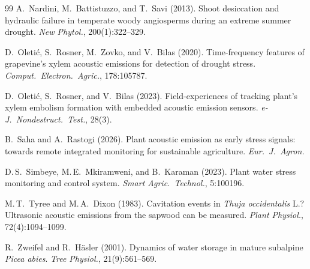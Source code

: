 \documentclass[10pt,a4paper,twocolumn]{article}
\begin{document}
{\begin{thebibliography}{99}
A.~Nardini, M.~Battistuzzo, and T.~Savi (2013).
Shoot desiccation and hydraulic failure in temperate woody angiosperms during an extreme summer drought.
\textit{New Phytol.}, 200(1):322--329.

D.~Oleti\'{c}, S.~Rosner, M.~Zovko, and V.~Bilas (2020).
Time-frequency features of grapevine's xylem acoustic emissions for detection of drought stress.
\textit{Comput.\ Electron.\ Agric.}, 178:105787.

D.~Oleti\'{c}, S.~Rosner, and V.~Bilas (2023).
Field-experiences of tracking plant's xylem embolism formation with embedded acoustic emission sensors.
\textit{e-J.\ Nondestruct.\ Test.}, 28(3).

B.~Saha and A.~Rastogi (2026).
Plant acoustic emission as early stress signals: towards remote integrated monitoring for sustainable agriculture.
\textit{Eur.\ J.\ Agron.}

D.\,S.~Simbeye, M.\,E.~Mkiramweni, and B.~Karaman (2023).
Plant water stress monitoring and control system.
\textit{Smart Agric.\ Technol.}, 5:100196.

M.\,T.~Tyree and M.\,A.~Dixon (1983).
Cavitation events in \textit{Thuja occidentalis} L.?
Ultrasonic acoustic emissions from the sapwood can be measured.
\textit{Plant Physiol.}, 72(4):1094--1099.

R.~Zweifel and R.~H\"asler (2001).
Dynamics of water storage in mature subalpine \textit{Picea abies}.
\textit{Tree Physiol.}, 21(9):561--569.

\end{thebibliography}
}
\end{document}
